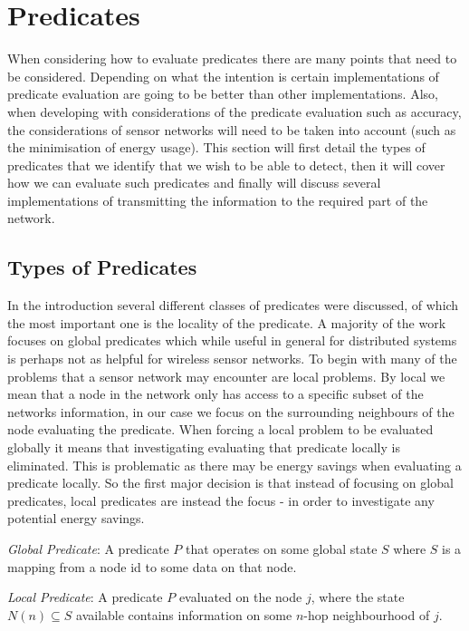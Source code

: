\section{Predicates}

When considering how to evaluate predicates there are many points that need to be considered. Depending on what the intention is certain implementations of predicate evaluation are going to be better than other implementations. Also, when developing with considerations of the predicate evaluation such as accuracy, the considerations of sensor networks will need to be taken into account (such as the minimisation of energy usage). This section will first detail the types of predicates that we identify that we wish to be able to detect, then it will cover how we can evaluate such predicates and finally will discuss several implementations of transmitting the information to the required part of the network.

\subsection{Types of Predicates}

In the introduction several different classes of predicates were discussed, of which the most important one is the locality of the predicate. A majority of the work focuses on global predicates \cite{277788,345831,553309} which while useful in general for distributed systems is perhaps not as helpful for wireless sensor networks. To begin with many of the problems that a sensor network may encounter are local problems. By local we mean that a node in the network only has access to a specific subset of the networks information, in our case we focus on the surrounding neighbours of the node evaluating the predicate. When forcing a local problem to be evaluated globally it means that investigating evaluating that predicate locally is eliminated. This is problematic as there may be energy savings when evaluating a predicate locally. So the first major decision is that instead of focusing on global predicates, local predicates are instead the focus - in order to investigate any potential energy savings.

\begin{mydef}
\emph{Global Predicate}: A predicate $P$ that operates on some global state $S$ where $S$ is a mapping from a node id to some data on that node.
\end{mydef}

\begin{mydef}
\emph{Local Predicate}: A predicate $P$ evaluated on the node $j$, where the state $N(n) \subseteq S$ available contains information on some $n$-hop neighbourhood of $j$.
\end{mydef}


